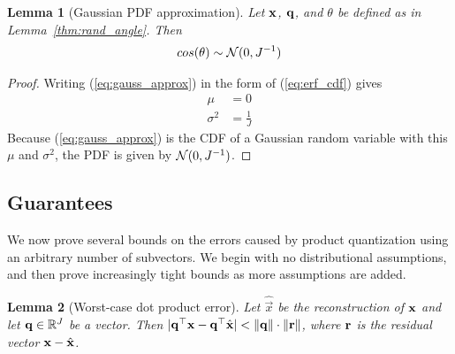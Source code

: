 \documentclass[]{article}
\newtheorem{lemma}{Lemma}[section]
\newtheorem{corollary}{Corrolary}[section]
\begin{document}
\begin{lemma}[Gaussian PDF approximation] \label{thm:gauss_pdf}
Let $\mathbf{x}$, $\mathbf{q}$, and $\theta$ be defined as in Lemma~\ref{thm:rand_angle}. Then
\begin{align} \label{eq:normal_approx_pdf}
    cos(\theta) \sim \operatorname{\mathcal{N}}(0, J^{-1})
\end{align}
\end{lemma}

\begin{proof} Writing (\ref{eq:gauss_approx}) in the form of (\ref{eq:erf_cdf}) gives
\begin{align}
    \mu &= 0 \\
    \sigma^2 &= \frac{1}{J}
\end{align}
Because (\ref{eq:gauss_approx}) is the CDF of a Gaussian random variable with this $\mu$ and $\sigma^2$, the PDF is given by $\operatorname{\mathcal{N}}(0, J^{-1})$.
\end{proof}


\subsection{Guarantees}%

We now prove several bounds on the errors caused by product quantization using an arbitrary number of subvectors. We begin with no distributional assumptions, and then prove increasingly tight bounds as more assumptions are added.



\begin{lemma}[Worst-case dot product error] \label{thm:worst_dotprod}
Let $\hat{\vec{x}}$ be the reconstruction of $\mathbf{x}$ and let $\mathbf{q} \in \mathbb{R}^J$ be a vector. Then $\lvert\mathbf{q}^\top \mathbf{x} - \mathbf{q}^\top \hat{\mathbf{x}}\rvert < \lVert\mathbf{q}\rVert \cdot \lVert\mathbf{r}\rVert$, where $\mathbf{r}$ is the residual vector $\mathbf{x} - \hat{\mathbf{x}}$.
\end{lemma}
\end{document}

